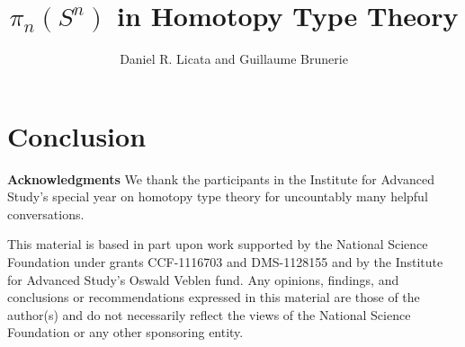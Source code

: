 \documentclass{drl-common/llncs}
\begin{document}
\title{$\pi_n(S^n)$ in Homotopy Type Theory}


\author{Daniel R. Licata
        and Guillaume Brunerie}


\maketitle



\section{Conclusion}

\textbf{Acknowledgments} We thank the participants in the 
Institute for Advanced Study's special year on homotopy type theory
for uncountably many helpful conversations.  

This material is based in part upon work supported by the National
Science Foundation under grants CCF-1116703 and DMS-1128155 and by the
Institute for Advanced Study's Oswald Veblen fund.  Any opinions,
findings, and conclusions or recommendations expressed in this material
are those of the author(s) and do not necessarily reflect the views of
the National Science Foundation or any other sponsoring entity.

{ \small


}
\end{document}
